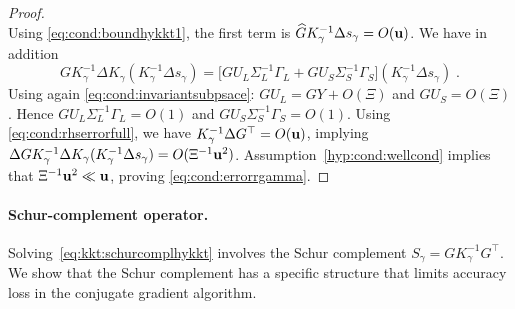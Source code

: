 \begin{proof}
\begin{equation}
\end{equation}
Using \eqref{eq:cond:boundhykkt1}, the first term is $\widehat{G} K_\gamma^{-1} \Delta s_\gamma = O(\mathbf{u})$.
We have in addition
\begin{equation}
  G K_\gamma^{-1}\Delta K_\gamma (K_\gamma^{-1} \Delta s_\gamma)  =
  \big[ G U_L \Sigma_L^{-1} \Gamma_L + G U_S \Sigma_S^{-1} \Gamma_S \big] (K_\gamma^{-1} \Delta s_\gamma) \; .
\end{equation}
Using again \eqref{eq:cond:invariantsubpsace}:
$G U_L = G Y + O(\Xi)$ and $G U_S = O(\Xi)$. Hence
$G U_L \Sigma_L^{-1} \Gamma_L = O(1)$ and $G U_S \Sigma_S^{-1} \Gamma_S = O(1)$.
Using \eqref{eq:cond:rhserrorfull}, we have $K_\gamma^{-1} \Delta G^\top = O(\mathbf{u})$,
implying $\Delta G K_\gamma^{-1} \Delta K_\gamma (K_\gamma^{-1} \Delta s_\gamma) = O(\Xi^{-1} \mathbf{u}^{2})$.
Assumption~\ref{hyp:cond:wellcond} implies that $\Xi^{-1} \mathbf{u}^2 \ll \mathbf{u}$,
proving \eqref{eq:cond:errorrgamma}.
\end{proof}

\paragraph{Schur-complement operator.}
Solving~\eqref{eq:kkt:schurcomplhykkt}
involves the Schur complement $S_\gamma = G K_\gamma^{-1} G^\top$.
We show that the Schur complement
has a specific structure that limits accuracy loss
in the conjugate gradient algorithm.

